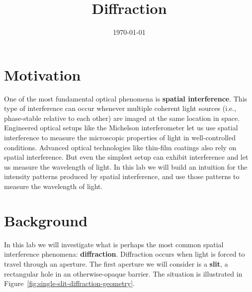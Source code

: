 \documentclass[]{manual}
\title{Diffraction}
\date{\today}
\begin{document}
    \maketitle
    \thispagestyle{firstpage}


    \section{Motivation}

    One of the most fundamental optical phenomena is \textbf{spatial interference}.
    This type of interference can occur whenever multiple coherent light sources (i.e., phase-stable relative to each other) are imaged at the same location in space.
    Engineered optical setups like the Michelson interferometer let us use spatial interference to measure the microscopic properties of light in well-controlled conditions.
    Advanced optical technologies like thin-film coatings also rely on spatial interference.
    But even the simplest setup can exhibit interference and let us measure the wavelength of light.
    In this lab we will build an intuition for the intensity patterns produced by spatial interference, and use those patterns to measure the wavelength of light.


    \section{Background}

    In this lab we will investigate what is perhaps the most common spatial interference phenomena: \textbf{diffraction}.
    Diffraction occurs when light is forced to travel through an aperture.
    The first aperture we will consider is a \textbf{slit}, a rectangular hole in an otherwise-opaque barrier.
    The situation is illustrated in Figure~\ref{fig:single-slit-diffraction-geometry}.
\end{document}
